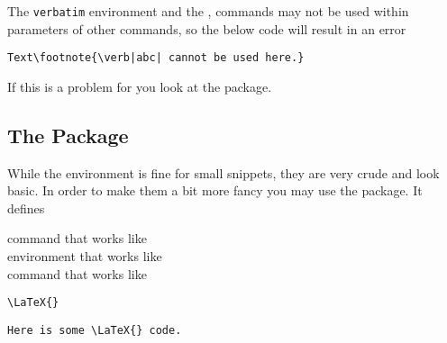 The \texttt{verbatim} environment and the , 
commands may not be used within parameters of other commands, so the below code
will result in an error
\begin{verbatim}
Text\footnote{\verb|abc| cannot be used here.}
\end{verbatim}
If this is a problem for you look at the  package.

\subsection{The  Package}

While the  environment is fine for small snippets, they are very
crude and look basic. In order to make them a bit more fancy you may use the
 package. It defines
\begin{lscommand}
   command that works like  \\
   environment that works like  \\
   command that works like 
\end{lscommand}
\begin{example}
\lstinline|\LaTeX{}|

\begin{lstlisting}
Here is some \LaTeX{} code.
\end{lstlisting}


\end{example}

